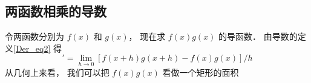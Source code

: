 \subsection{两函数相乘的导数}
令两函数分别为 $f(x)$ 和 $g(x)$， 现在求 $f(x)g(x)$ 的导函数． 由导数的定义\autoref{Der_eq2} 得
\begin{equation}
[f(x)g(x)]' = \lim_{h\to 0}[f(x+h)g(x+h) - f(x)g(x)]/h
\end{equation}
从几何上来看， 我们可以把 $f(x)g(x)$ 看做一个矩形的面积


















